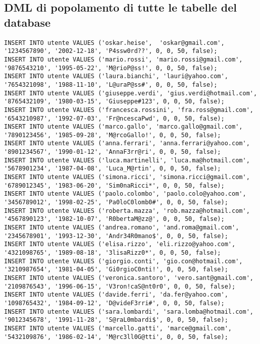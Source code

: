 \subsection{DML di popolamento di tutte le tabelle del database}
\begin{lstlisting}
INSERT INTO utente VALUES ('oskar.heise',  'oskar@gmail.com', 
'1234567890', '2002-12-18', 'P4ssw0rd??', 0, 0, 50, false);
INSERT INTO utente VALUES ('mario.rossi', 'mario.rossi@gmail.com',
'9876543210', '1995-05-22', 'M@rioP@ss!', 0, 0, 50, false);
INSERT INTO utente VALUES ('laura.bianchi', 'lauri@yahoo.com',
'7654321098', '1988-11-10', 'L@uraP@ss#', 0, 0, 50, false);
INSERT INTO utente VALUES ('giuseppe.verdi', 'gius.verdi@hotmail.com',
'8765432109', '1980-03-15', 'Giuseppe#123', 0, 0, 50, false);
INSERT INTO utente VALUES ('francesca.rossini', 'fra.ross@gmail.com',
'6543210987', '1992-07-03', 'Fr@ncescaPwd', 0, 0, 50, false);
INSERT INTO utente VALUES ('marco.gallo', 'marco.gallo@gmail.com',
'7890123456', '1985-09-28', 'M@rcoGallo!', 0, 0, 50, false);
INSERT INTO utente VALUES ('anna.ferrari', 'anna.ferrari@yahoo.com',
'8901234567', '1990-01-12', 'AnnaF3rr@ri', 0, 0, 50, false);
INSERT INTO utente VALUES ('luca.martinelli', 'luca.ma@hotmail.com',
'5678901234', '1987-04-08', 'Luca_M@rtin', 0, 0, 50, false);
INSERT INTO utente VALUES ('simona.ricci', 'simona.ricci@gmail.com',
'6789012345', '1983-06-20', 'Sim0naRicci*', 0, 0, 50, false);
INSERT INTO utente VALUES ('paolo.colombo', 'paolo.colo@yahoo.com',
'3456789012', '1998-02-25', 'Pa0loC0lomb0#', 0, 0, 50, false);
INSERT INTO utente VALUES ('roberta.mazza', 'rob.mazza@hotmail.com',
'4567890123', '1982-10-07', 'R0bertaM@zz@', 0, 0, 50, false);
INSERT INTO utente VALUES ('andrea.romano', 'and.roma@gmail.com',
'2345678901', '1993-12-30', 'Andr34R0mano$', 0, 0, 50, false);
INSERT INTO utente VALUES ('elisa.rizzo', 'eli.rizzo@yahoo.com',
'4321098765', '1989-08-18', '3lisaRizz0*', 0, 0, 50, false);
INSERT INTO utente VALUES ('giorgio.conti', 'gio.con@hotmail.com',
'3210987654', '1981-04-05', 'Gi0rgioC0nti!', 0, 0, 50, false);
INSERT INTO utente VALUES ('veronica.santoro', 'vero.sant@gmail.com',
'2109876543', '1996-06-15', 'V3ron!caS@nt0r0', 0, 0, 50, false);
INSERT INTO utente VALUES ('davide.ferri', 'da.fer@yahoo.com',
'1098765432', '1984-09-12', 'D@videF3rri#', 0, 0, 50, false);
INSERT INTO utente VALUES ('sara.lombardi', 'sara.lomba@hotmail.com',
'9012345678', '1991-11-28', 'S@raL0mbardi$', 0, 0, 50, false);
INSERT INTO utente VALUES ('marcello.gatti', 'marce@gmail.com',
'5432109876', '1986-02-14', 'M@rc3ll0G@tti', 0, 0, 50, false);

\end{lstlisting}
